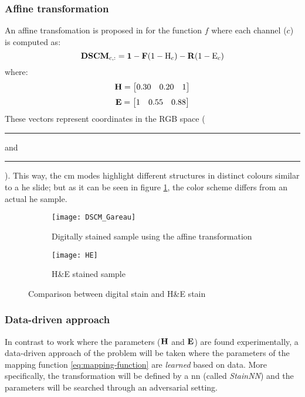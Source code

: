 \documentclass[../main.tex]{subfiles}
\begin{document}
\subsubsection{Affine transformation}
\label{sec:affine-transformation}
An affine transfomation is proposed in \cite{Gareau2009} for the function $f$
where each channel ($c$) is computed as:
\begin{equation} \label{eq:affine-transformation}
	\mathbf{DSCM}_{c,:} = \mathbf{1}
	- \mathbf{F} (1 - \text{H}_c) - \mathbf{R} (1 - \text{E}_c)
\end{equation}
where:
$$ \mathbf{H} = \begin{bmatrix} 0.30 & 0.20 & 1 \end{bmatrix} $$
$$ \mathbf{E} = \begin{bmatrix} 1 & 0.55 & 0.88 \end{bmatrix} $$
These vectors represent coordinates in the RGB space (
\textcolor{Hcolor}{\rule{0.7\baselineskip}{0.7\baselineskip}} and
\textcolor{Ecolor}{\rule{0.7\baselineskip}{0.7\baselineskip}}).
This way, the \gls{cm} modes highlight different structures in distinct
colours similar to a \gls{he} slide; but as it can be seen in figure \ref{fig:affine-example},
the color scheme differs from an actual \gls{he} sample.

\begin{figure}[h]
\centering
\begin{subfigure}{.5\textwidth}
  \centering
  \texttt{[image: DSCM\_Gareau]}
  \caption{Digitally stained sample using the affine transformation}
\end{subfigure}%
\begin{subfigure}{.5\textwidth}
  \centering
  \texttt{[image: HE]}
  \caption{H\&E stained sample}
\end{subfigure}
\caption{Comparison between digital stain and H\&E stain}
\label{fig:affine-example}
\end{figure}

\subsubsection{Data-driven approach}
In contrast to \cite{Gareau2009} work where the parameters
($\mathbf{H}$ and $\mathbf{E}$) are found experimentally, a data-driven approach
of the problem will be taken where the parameters of the mapping function
\eqref{eq:mapping-function} are \emph{learned} based on data.
More specifically, the transformation will be defined by a \gls{nn} (called \emph{StainNN})
and the parameters will be searched through an adversarial setting.
\end{document}
